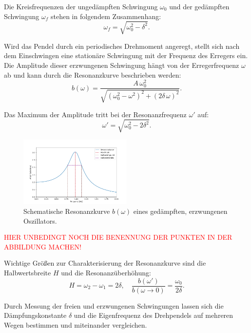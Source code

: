 Die Kreisfrequenzen der ungedämpften Schwingung $\omega_0$ und der gedämpften Schwingung $\omega_f$ stehen in folgendem Zusammenhang:
\begin{equation}
\omega_f = \sqrt{\omega_0^2 - \delta^2}.
\end{equation}

Wird das Pendel durch ein periodisches Drehmoment angeregt, stellt sich nach dem Einschwingen eine stationäre Schwingung mit der Frequenz des Erregers ein. Die Amplitude dieser erzwungenen Schwingung hängt von der Erregerfrequenz $\omega$ ab und kann durch die Resonanzkurve beschrieben werden:
\begin{equation}
b(\omega) = \frac{A \, \omega_0^2}{\sqrt{(\omega_0^2 - \omega^2)^2 + (2 \delta \, \omega)^2}}.
\end{equation}

Das Maximum der Amplitude tritt bei der Resonanzfrequenz $\omega'$ auf:
\begin{equation}
\omega' = \sqrt{\omega_0^2 - 2 \delta^2}.
\end{equation}

\begin{figure}[h!]
    \centering
    \includegraphics[width=0.5\textwidth]{img/13/Resonanzkurve_allgemein.png}
    \caption{ Schematische Resonanzkurve $b(\omega)$ eines gedämpften, erzwungenen Oszillators.}
    \label{fig:resonanzkurve}
\end{figure}

\textcolor{red}{HIER UNBEDINGT NOCH DIE BENENNUNG DER PUNKTEN IN DER ABBILDUNG MACHEN!}

Wichtige Größen zur Charakterisierung der Resonanzkurve sind die Halbwertsbreite $H$ und die Resonanzüberhöhung:
\begin{equation}
H = \omega_2 - \omega_1 = 2 \delta, \quad \frac{b(\omega')}{b(\omega \to 0)} = \frac{\omega_0}{2 \delta}.
\end{equation}

Durch Messung der freien und erzwungenen Schwingungen lassen sich die Dämpfungskonstante $\delta$ und die Eigenfrequenz des Drehpendels auf mehreren Wegen bestimmen und miteinander vergleichen.
